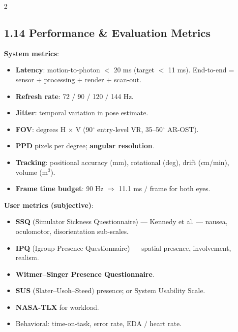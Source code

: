 \begin{paracol}{2}
\subsection*{1.14 Performance \& Evaluation Metrics}
\textbf{System metrics}:
\begin{itemize}[leftmargin=*,nosep]
  \item \textbf{Latency}: motion-to-photon $<$ 20 ms (target $<$ 11 ms). End-to-end = sensor + processing + render + scan-out.
  \item \textbf{Refresh rate}: 72 / 90 / 120 / 144 Hz.
  \item \textbf{Jitter}: temporal variation in pose estimate.
  \item \textbf{FOV}: degrees H $\times$ V (90$^\circ$ entry-level VR, 35–50$^\circ$ AR-OST).
  \item \textbf{PPD} pixels per degree; \textbf{angular resolution}.
  \item \textbf{Tracking}: positional accuracy (mm), rotational (deg), drift (cm/min), volume (m$^3$).
  \item \textbf{Frame time budget}: 90 Hz $\Rightarrow$ 11.1 ms / frame for both eyes.
\end{itemize}
\textbf{User metrics (subjective)}:
\begin{itemize}[leftmargin=*,nosep]
  \item \textbf{SSQ} (Simulator Sickness Questionnaire) — Kennedy et al. — nausea, oculomotor, disorientation sub-scales.
  \item \textbf{IPQ} (Igroup Presence Questionnaire) — spatial presence, involvement, realism.
  \item \textbf{Witmer–Singer Presence Questionnaire}.
  \item \textbf{SUS} (Slater–Usoh–Steed) presence; or System Usability Scale.
  \item \textbf{NASA-TLX} for workload.
  \item Behavioral: time-on-task, error rate, EDA / heart rate.
\end{itemize}

\switchcolumn


\end{paracol}
